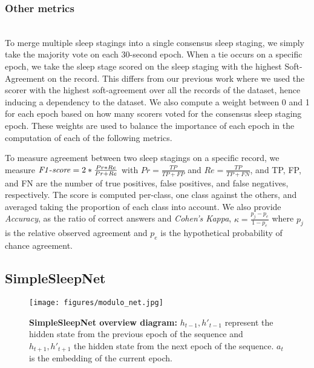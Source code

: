 \documentclass[journal]{IEEEtran}
\begin{document}
\subsubsection*{Other metrics} \label{explanation_consensus} \hfill\\
To merge multiple sleep stagings into a single consensus sleep staging, we simply take the majority vote on each 30-second epoch. When a tie occurs on a specific epoch, we take the sleep stage scored on the sleep staging with the highest Soft-Agreement on the record. This differs from our previous work \cite{Arnal662734} where we used the scorer with the highest soft-agreement over all the records of the dataset, hence inducing a dependency to the dataset. We also compute a weight between 0 and 1 for each epoch based on how many scorers voted for the consensus sleep staging epoch. These weights are used to balance the importance of each epoch in the computation of each of the following metrics.

To measure agreement between two sleep stagings on a specific record, we measure  ${\operatorname{\mathit{F1-score}}} = 2*\frac{Pr * Re}{Pr + Re}$ with $Pr = \frac{TP}{TP + FP}$ and $ Re = \frac{TP}{TP + FN}$, and TP, FP, and FN are the number of true positives, false positives, and false negatives, respectively. The score is computed per-class, one class against the others, and averaged taking the proportion of each class into account. We also provide \textit{Accuracy}, as the ratio of correct answers and \textit{Cohen's Kappa}, $\kappa = \frac{p_j - p_e}{1 - p_e}$ where $p_j$ is the relative observed agreement and $p_e$ is the hypothetical probability of chance agreement.

\subsection{SimpleSleepNet}
\label{sec:simple_sleep_net}

\begin{figure*}
\begin{center}
  \texttt{[image: figures/modulo\_net.jpg]}
  \caption{\textbf{SimpleSleepNet overview diagram:} 
  $h_{t-1}, h'_{t-1}$ represent the hidden state from the previous epoch of the sequence and $h_{t+1}, h'_{t+1}$ the hidden state from the next epoch of the sequence. $a_t$ is the embedding of the current epoch.}
  \label{SimpleSleepNetFigure}
\end{center}
\vspace{-1.8em}
\end{figure*}
\end{document}
